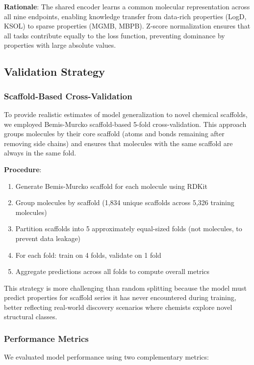 \documentclass[11pt,a4paper]{article}
\begin{document}
\textbf{Rationale}: The shared encoder learns a common molecular representation across all nine endpoints, enabling knowledge transfer from data-rich properties (LogD, KSOL) to sparse properties (MGMB, MBPB). Z-score normalization ensures that all tasks contribute equally to the loss function, preventing dominance by properties with large absolute values.

\subsection{Validation Strategy}

\subsubsection{Scaffold-Based Cross-Validation}

To provide realistic estimates of model generalization to novel chemical scaffolds, we employed Bemis-Murcko scaffold-based 5-fold cross-validation. This approach groups molecules by their core scaffold (atoms and bonds remaining after removing side chains) and ensures that molecules with the same scaffold are always in the same fold.

\textbf{Procedure}:
\begin{enumerate}
    \item Generate Bemis-Murcko scaffold for each molecule using RDKit
    \item Group molecules by scaffold (1,834 unique scaffolds across 5,326 training molecules)
    \item Partition scaffolds into 5 approximately equal-sized folds (not molecules, to prevent data leakage)
    \item For each fold: train on 4 folds, validate on 1 fold
    \item Aggregate predictions across all folds to compute overall metrics
\end{enumerate}

This strategy is more challenging than random splitting because the model must predict properties for scaffold series it has never encountered during training, better reflecting real-world discovery scenarios where chemists explore novel structural classes.

\subsubsection{Performance Metrics}

We evaluated model performance using two complementary metrics:
\end{document}
